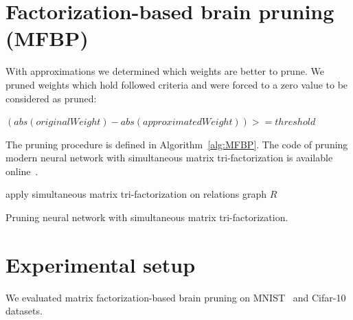 \documentclass{article} %
\begin{document}
\section{Factorization-based brain pruning (MFBP)}
With approximations we determined which weights are better to prune. We pruned
weights which hold followed criteria and were forced to a zero value to be
considered as pruned:

$(abs(originalWeight) - abs(approximatedWeight)) >= threshold$


The pruning procedure is defined in Algorithm~\ref{alg:MFBP}.
The code of pruning modern neural network with simultaneous matrix 
tri-factorization is available online~\cite{code}.

\begin{algorithm}[H]
\label{alg:MFBP}
 apply simultaneous matrix tri-factorization on relations graph $R$\;
 \caption{Pruning neural network with simultaneous matrix tri-factorization.}
 
\end{algorithm}



\section{Experimental setup}

We evaluated matrix factorization-based brain pruning on 
MNIST~\cite{lecun-mnisthandwrittendigit-2010} and 
Cifar-10~\cite{krizhevsky2009learning} datasets. 
\end{document}
